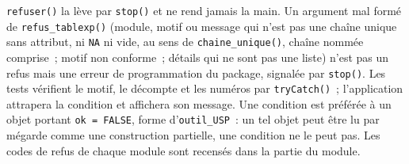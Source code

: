 \documentclass[a4paper,11pt]{article}
\newcommand{\code}[1]{\texttt{\small #1}}
\begin{document}
\noindent
\code{refuser()} la lève par \code{stop()} et ne rend jamais la main. Un
argument mal formé de \code{refus\_tablexp()} (module, motif ou message
qui n'est pas une chaîne unique sans attribut, ni \code{NA} ni vide, au sens
de \code{chaine\_unique()}, chaîne nommée comprise~; motif non conforme~;
détails qui ne sont pas une liste) n'est pas un refus mais une
erreur de programmation du package, signalée par \code{stop()}. Les tests
vérifient le motif, le décompte et les numéros par \code{tryCatch()}~;
l'application attrapera la condition et affichera son message. Une condition
est préférée à un objet portant \code{ok = FALSE}, forme d'\code{outil\_USP}~:
un tel objet peut être lu par mégarde comme une construction partielle, une
condition ne le peut pas. Les codes de refus de chaque module sont recensés
dans la partie du module.
\end{document}
